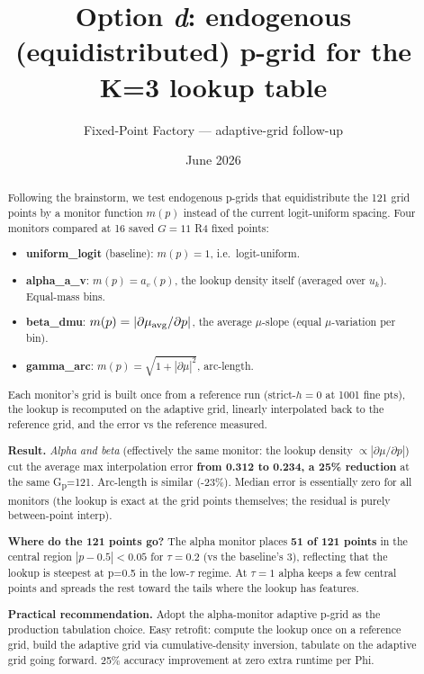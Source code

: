 \documentclass[11pt]{article}
\title{Option \textit{d}: endogenous (equidistributed) p-grid for the K=3 lookup table}
\author{Fixed-Point Factory --- adaptive-grid follow-up}
\date{June 2026}
\begin{document}
\maketitle

\begin{abstract}
\noindent
Following the brainstorm, we test endogenous p-grids that equidistribute the
121 grid points by a monitor function $m(p)$ instead of the current
logit-uniform spacing. Four monitors compared at 16 saved $G{=}11$ R4
fixed points:
\begin{itemize}
  \item \textbf{uniform\_logit} (baseline): $m(p) = 1$, i.e.\ logit-uniform.
  \item \textbf{alpha\_a\_v}: $m(p) = a_v(p)$, the lookup density itself
        (averaged over $u_k$). Equal-mass bins.
  \item \textbf{beta\_dmu}: $m(p) = |\partial \mu_{\rm avg} / \partial p|$,
        the average $\mu$-slope (equal $\mu$-variation per bin).
  \item \textbf{gamma\_arc}: $m(p) = \sqrt{1 + |\partial \mu|^2}$, arc-length.
\end{itemize}
Each monitor's grid is built once from a reference run (strict-$h{=}0$ at
1001 fine pts), the lookup is recomputed on the adaptive grid, linearly
interpolated back to the reference grid, and the error vs the reference
measured.

\textbf{Result.} \emph{Alpha and beta} (effectively the same monitor: the
lookup density $\propto |\partial \mu /\partial p|$) cut the average max
interpolation error \textbf{from 0.312 to 0.234, a 25\% reduction} at the
same G\textsubscript{p}=121. Arc-length is similar (-23\%). Median error is
essentially zero for all monitors (the lookup is exact at the grid points
themselves; the residual is purely between-point interp).

\textbf{Where do the 121 points go?} The alpha monitor places \textbf{51 of
121 points} in the central region $|p - 0.5| < 0.05$ for $\tau{=}0.2$
(vs the baseline's 3), reflecting that the lookup is steepest at p=0.5
in the low-$\tau$ regime. At $\tau{=}1$ alpha keeps a few central points
and spreads the rest toward the tails where the lookup has features.

\textbf{Practical recommendation.} Adopt the alpha-monitor adaptive p-grid
as the production tabulation choice. Easy retrofit: compute the lookup once
on a reference grid, build the adaptive grid via cumulative-density
inversion, tabulate on the adaptive grid going forward. 25\% accuracy
improvement at zero extra runtime per Phi.
\end{abstract}
\end{document}
